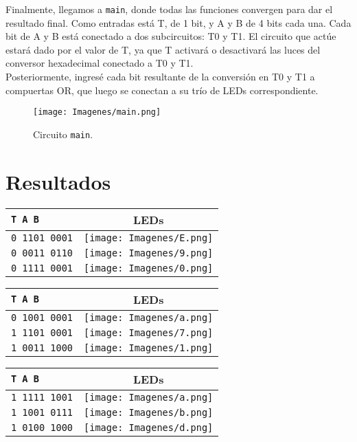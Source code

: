 \documentclass[a4paper,11pt]{article}
\begin{document}
Finalmente, llegamos a \texttt{main}, donde todas las funciones convergen para dar el resultado final. Como entradas está T, de 1 bit, y A y B de 4 bits cada una. Cada bit de A y B está conectado a dos subcircuitos: T0 y T1. El circuito que actúe estará dado por el valor de T, ya que T activará o desactivará las luces del conversor hexadecimal conectado a T0 y T1.\\

Posteriormente, ingresé cada bit resultante de la conversión en T0 y T1 a compuertas OR, que luego se conectan a su trío de LEDs correspondiente.\\

 \begin{figure}[h]
     \centering
     \texttt{[image: Imagenes/main.png]}
     \caption{Circuito \texttt{main}.}
     \label{fig:main}
 \end{figure}

\section{Resultados}
\begin{minipage}{0.30\linewidth}
    \begin{tabular}{|l|c|}
    \hline
        \texttt{T A B} & LEDs\\ \hline
        \texttt{0 1101 0001} & \texttt{[image: Imagenes/E.png]} \\ \hline
        \texttt{0 0011 0110} & \texttt{[image: Imagenes/9.png]} \\ \hline
        \texttt{0 1111 0001} & \texttt{[image: Imagenes/0.png]} \\ \hline
    \end{tabular}
\end{minipage}
\hfill
\begin{minipage}{0.30\linewidth}
    \begin{tabular}{|l|c|}
    \hline
        \texttt{T A B} & LEDs\\ \hline
        \texttt{0 1001 0001} & \texttt{[image: Imagenes/a.png]} \\ \hline
        \texttt{1 1101 0001} & \texttt{[image: Imagenes/7.png]} \\ \hline
        \texttt{1 0011 1000} & \texttt{[image: Imagenes/1.png]} \\ \hline
    \end{tabular}
\end{minipage}
\hfill
\begin{minipage}{0.25\linewidth}
    \begin{tabular}{|l|c|}
    \hline
        \texttt{T A B} & LEDs\\ \hline
        \texttt{1 1111 1001} & \texttt{[image: Imagenes/a.png]} \\ \hline
        \texttt{1 1001 0111} & \texttt{[image: Imagenes/b.png]} \\ \hline
        \texttt{1 0100 1000} & \texttt{[image: Imagenes/d.png]} \\ \hline
    \end{tabular}
\end{minipage}
\end{document}
